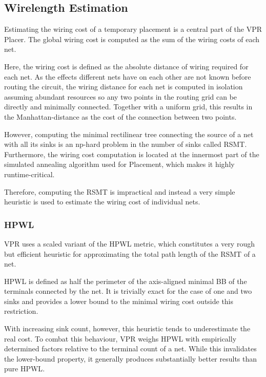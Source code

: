 \subsection{Wirelength Estimation}

Estimating the wiring cost of a temporary placement is a central part of the \gls{VPR} Placer. The global wiring cost is computed as the sum of the wiring costs of each net.

Here, the wiring cost is defined as the absolute distance of wiring required for each net. As the effects different nets have on each other are not known before routing the circuit, the wiring distance for each net is computed in isolation assuming abundant resources so any two points in the routing grid can be directly and minimally connected. Together with a uniform grid, this results in the Manhattan-distance as the cost of the connection between two points.

However, computing the minimal rectilinear tree connecting the source of a net with all its sinks is an np-hard problem in the number of sinks called \gls{RSMT}\cite{rsmt-complexity}. Furthermore, the wiring cost computation is located at the innermost part of the simulated annealing algorithm used for Placement, which makes it highly runtime-critical.

Therefore, computing the \gls{RSMT} is impractical and instead a very simple heuristic is used to estimate the wiring cost of individual nets.

\subsubsection{\gls{HPWL}}

\gls{VPR} uses a scaled variant of the \gls{HPWL} metric, which constitutes a very rough but efficient heuristic for approximating the total path length of the \gls{RSMT} of a net.

\gls{HPWL} is defined as half the perimeter of the axis-aligned minimal \gls{BB} of the terminals connected by the net. It is trivially exact for the case of one and two sinks and provides a lower bound to the minimal wiring cost outside this restriction. 

\pagebreak

With increasing sink count, however, this heuristic tends to underestimate the real cost. To combat this behaviour, \gls{VPR} weighs \gls{HPWL} with empirically determined factors relative to the terminal count of a net. While this invalidates the lower-bound property, it generally produces substantially better results than pure \gls{HPWL}.

